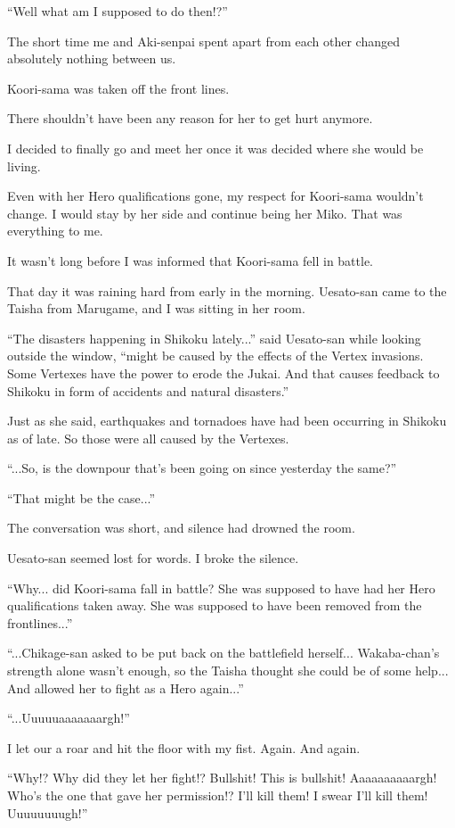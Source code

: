 ``Well what am I supposed to do then!?''

The short time me and Aki-senpai spent apart from each other changed absolutely nothing between us.

Koori-sama was taken off the front lines.

There shouldn't have been any reason for her to get hurt anymore.

I decided to finally go and meet her once it was decided where she would be living.

Even with her Hero qualifications gone, my respect for Koori-sama wouldn't change. I would stay by her side and continue being her Miko. That was everything to me.


It wasn't long before I was informed that Koori-sama fell in battle.


That day it was raining hard from early in the morning. Uesato-san came to the Taisha from Marugame, and I was sitting in her room.

``The disasters happening in Shikoku lately...'' said Uesato-san while looking outside the window, ``might be caused by the effects of the Vertex invasions. Some Vertexes have the power to erode the Jukai. And that causes feedback to Shikoku in form of accidents and natural disasters.''

Just as she said, earthquakes and tornadoes have had been occurring in Shikoku as of late. So those were all caused by the Vertexes.

``...So, is the downpour that's been going on since yesterday the same?''

``That might be the case...''

The conversation was short, and silence had drowned the room.

Uesato-san seemed lost for words. I broke the silence.

``Why... did Koori-sama fall in battle? She was supposed to have had her Hero qualifications taken away. She was supposed to have been removed from the frontlines...''

``...Chikage-san asked to be put back on the battlefield herself... Wakaba-chan's strength alone wasn't enough, so the Taisha thought she could be of some help... And allowed her to fight as a Hero again...''

``...Uuuuuaaaaaaargh!''

I let our a roar and hit the floor with my fist. Again. And again.

``Why!? Why did they let her fight!? Bullshit! This is bullshit! Aaaaaaaaaargh! Who's the one that gave her permission!? I'll kill them! I swear I'll kill them! Uuuuuuuugh!''

